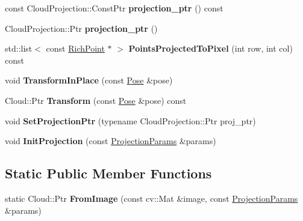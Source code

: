 \begin{DoxyCompactItemize}
\item 
\hypertarget{classdepth__clustering_1_1Cloud_ab1aead23e6af2bcce5f937a9f559ccfb}{const Cloud\-Projection\-::\-Const\-Ptr {\bfseries projection\-\_\-ptr} () const }\label{classdepth__clustering_1_1Cloud_ab1aead23e6af2bcce5f937a9f559ccfb}

\item 
\hypertarget{classdepth__clustering_1_1Cloud_ac973b1445bd435f0f2df0dc06b654f07}{Cloud\-Projection\-::\-Ptr {\bfseries projection\-\_\-ptr} ()}\label{classdepth__clustering_1_1Cloud_ac973b1445bd435f0f2df0dc06b654f07}

\item 
\hypertarget{classdepth__clustering_1_1Cloud_a1a00bd07a34496425382d8db089f2e47}{std\-::list$<$ const \hyperlink{classdepth__clustering_1_1RichPoint}{Rich\-Point} $\ast$ $>$ {\bfseries Points\-Projected\-To\-Pixel} (int row, int col) const }\label{classdepth__clustering_1_1Cloud_a1a00bd07a34496425382d8db089f2e47}

\item 
\hypertarget{classdepth__clustering_1_1Cloud_a448638dcb9f8e5a17370ba81e9e80d68}{void {\bfseries Transform\-In\-Place} (const \hyperlink{classdepth__clustering_1_1Pose}{Pose} \&pose)}\label{classdepth__clustering_1_1Cloud_a448638dcb9f8e5a17370ba81e9e80d68}

\item 
\hypertarget{classdepth__clustering_1_1Cloud_a099775862c9d93b7c6945ef86f3eabfc}{Cloud\-::\-Ptr {\bfseries Transform} (const \hyperlink{classdepth__clustering_1_1Pose}{Pose} \&pose) const }\label{classdepth__clustering_1_1Cloud_a099775862c9d93b7c6945ef86f3eabfc}

\item 
\hypertarget{classdepth__clustering_1_1Cloud_abc1dcb82d072a45e8c00170cc927f537}{void {\bfseries Set\-Projection\-Ptr} (typename Cloud\-Projection\-::\-Ptr proj\-\_\-ptr)}\label{classdepth__clustering_1_1Cloud_abc1dcb82d072a45e8c00170cc927f537}

\item 
\hypertarget{classdepth__clustering_1_1Cloud_a052108fe3780dec4209b80e8b7886457}{void {\bfseries Init\-Projection} (const \hyperlink{classdepth__clustering_1_1ProjectionParams}{Projection\-Params} \&params)}\label{classdepth__clustering_1_1Cloud_a052108fe3780dec4209b80e8b7886457}

\end{DoxyCompactItemize}
\subsection*{Static Public Member Functions}
\begin{DoxyCompactItemize}
\item 
\hypertarget{classdepth__clustering_1_1Cloud_a30f8b04595f44fc56d42f556efbebe7f}{static Cloud\-::\-Ptr {\bfseries From\-Image} (const cv\-::\-Mat \&image, const \hyperlink{classdepth__clustering_1_1ProjectionParams}{Projection\-Params} \&params)}\label{classdepth__clustering_1_1Cloud_a30f8b04595f44fc56d42f556efbebe7f}

\end{DoxyCompactItemize}
